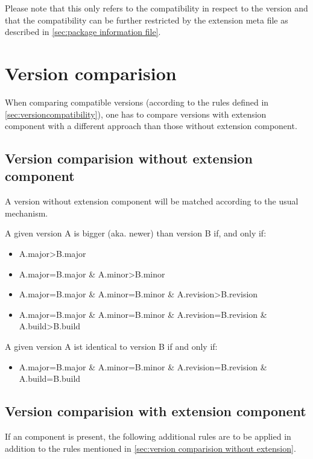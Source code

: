 Please note that this only refers to the compatibility in respect to the version and that the compatibility can be further restricted by the extension meta file as described in \ref{sec:package information file}.

\section[sec:version comparision]{Version comparision}

When comparing compatible versions (according to the rules defined in \ref{sec:versioncompatibility}), one has to compare versions with extension component with a different approach than those without extension component.

\subsection[sec:version comparision without extension]{Version comparision without extension component}
A version without extension component will be matched according to the usual mechanism.

A given version A is bigger (aka. newer) than version B if, and only if:
\begin{itemize}
\item A.major>B.major
\item A.major=B.major \& A.minor>B.minor
\item A.major=B.major \& A.minor=B.minor \& A.revision>B.revision
\item A.major=B.major \& A.minor=B.minor \& A.revision=B.revision \& A.build>B.build
\end{itemize}

A given version A ist identical to version B if and only if:
\begin{itemize}
\item A.major=B.major \& A.minor=B.minor \& A.revision=B.revision \& A.build=B.build
\end{itemize}

\subsection[sec:version comparision with extension]{Version comparision with extension component}

If an  component is present, the following additional rules are to be applied in addition to the rules mentioned in \ref{sec:version comparision without extension}.

